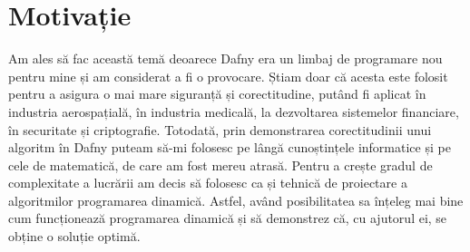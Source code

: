 \chapter*{Motivație} 

Am ales să fac această temă deoarece Dafny era un limbaj de programare nou pentru mine și am considerat a fi o provocare. Știam doar că acesta este folosit pentru a asigura o mai mare siguranță și corectitudine, putând fi aplicat în industria aerospațială, în industria medicală, la dezvoltarea sistemelor financiare, în securitate și  criptografie. Totodată, prin demonstrarea corectitudinii unui algoritm în Dafny puteam să-mi folosesc pe lângă cunoștințele informatice și pe cele  de matematică, de care am fost mereu atrasă. Pentru a crește gradul de complexitate a lucrării am decis să folosesc ca și tehnică de proiectare a algoritmilor programarea dinamică. Astfel, având posibilitatea sa înțeleg mai bine cum funcționează programarea dinamică și să demonstrez că, cu ajutorul ei, se obține o soluție optimă. 